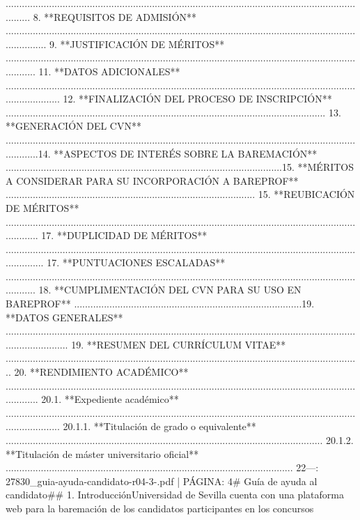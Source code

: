 \documentclass{article}
\begin{document}
\begin{itemize}
{{.......................................................................................................................................... 8. **REQUISITOS DE ADMISIÓN** ................................................................................................................................................ 9. **JUSTIFICACIÓN DE MÉRITOS** ............................................................................................................................................ 11. **DATOS ADICIONALES** ..................................................................................................................................................... 12. **FINALIZACIÓN DEL PROCESO DE INSCRIPCIÓN** ...................................................................................................................... 13. **GENERACIÓN DEL CVN** .............................................................................................................................................14. **ASPECTOS DE INTERÉS SOBRE LA BAREMACIÓN** ......................................................................................................15. **MÉRITOS A CONSIDERAR PARA SU INCORPORACIÓN A BAREPROF** ............................................................................................ 15. **REUBICACIÓN DE MÉRITOS** ............................................................................................................................................. 17. **DUPLICIDAD DE MÉRITOS** ............................................................................................................................................... 17. **PUNTUACIONES ESCALADAS** ............................................................................................................................................ 18. **CUMPLIMENTACIÓN DEL CVN PARA SU USO EN BAREPROF** ....................................................................................19. **DATOS GENERALES** ........................................................................................................................................................ 19. **RESUMEN DEL CURRÍCULUM VITAE** ................................................................................................................................... 20. **RENDIMIENTO ACADÉMICO** ............................................................................................................................................. 20.1. **Expediente académico** ..................................................................................................................................................... 20.1.1. **Titulación de grado o equivalente** ..................................................................................................................... 20.1.2. **Titulación de máster universitario oficial** .......................................................................................................... 22\n\n---\n\nFUENTE: 27830_guia-ayuda-candidato-r04-3-.pdf | PÁGINA: 4\n# Guía de ayuda al candidato\n\n## 1. Introducción\n\nLa Universidad de Sevilla cuenta con una plataforma web para la baremación de los candidatos participantes en los concursos }}
\end{itemize}
\end{document}
